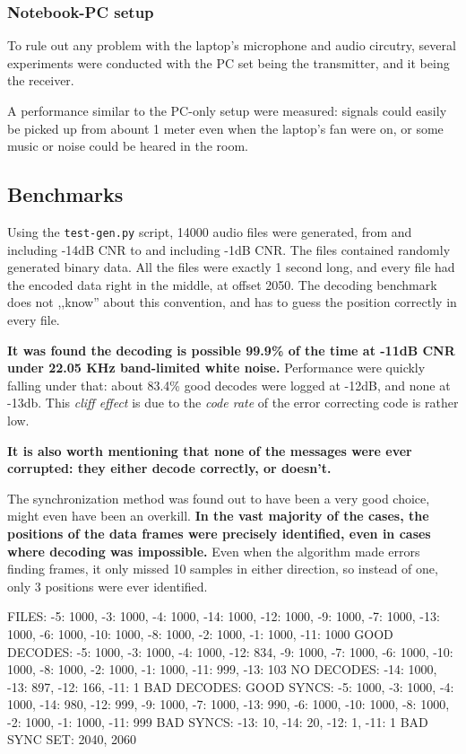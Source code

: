\documentclass[a4paper]{article}
\begin{document}
\subsubsection{Notebook-PC setup}

To rule out any problem with the laptop's microphone and audio 
circutry, several experiments were conducted with the PC set being the 
transmitter, and it being the receiver.

A performance similar to the PC-only setup were measured: signals could 
easily be picked up from abount 1 meter even when the laptop's fan were 
on, or some music or noise could be heared in the room.

\subsection{Benchmarks}

Using the \texttt{test-gen.py} script, 14000 audio files were 
generated, from and including -14dB CNR to and including -1dB CNR. The 
files contained randomly generated binary data. All the files were 
exactly 1 second long, and every file had the encoded data right in the 
middle, at offset 2050. The decoding benchmark does not ,,know'' about 
this convention, and has to guess the position correctly in every file.

\textbf{It was found the decoding is possible 99.9\% of the time at 
-11dB CNR under 22.05 KHz band-limited white noise.} Performance were 
quickly falling under that: about 83.4\% good decodes were logged at 
-12dB, and none at -13db. This \emph{cliff effect} is due to the 
\emph{code rate} of the error correcting code is rather low.

\textbf{It is also worth mentioning that none of the messages were ever 
corrupted: they either decode correctly, or doesn't.}

The synchronization method was found out to have been a very good 
choice, might even have been an overkill. \textbf{In the vast majority 
of the cases, the positions of the data frames were precisely 
identified, even in cases where decoding was impossible.} Even when the 
algorithm made errors finding frames, it only missed 10 samples in 
either direction, so instead of one, only 3 positions were ever 
identified.


FILES:         {-5: 1000, -3: 1000, -4: 1000, -14: 1000, -12: 1000, -9: 1000, -7: 1000, -13: 1000, -6: 1000, -10: 1000, -8: 1000, -2: 1000, -1: 1000, -11: 1000}
GOOD DECODES:  {-5: 1000, -3: 1000, -4: 1000, -12: 834, -9: 1000, -7: 1000, -6: 1000, -10: 1000, -8: 1000, -2: 1000, -1: 1000, -11: 999, -13: 103}
NO DECODES:    {-14: 1000, -13: 897, -12: 166, -11: 1}
BAD DECODES:   {}
GOOD SYNCS:    {-5: 1000, -3: 1000, -4: 1000, -14: 980, -12: 999, -9: 1000, -7: 1000, -13: 990, -6: 1000, -10: 1000, -8: 1000, -2: 1000, -1: 1000, -11: 999}
BAD SYNCS:     {-13: 10, -14: 20, -12: 1, -11: 1}
BAD SYNC SET:  {2040, 2060}
\end{document}
